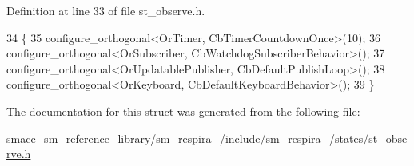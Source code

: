 Definition at line 33 of file st\+\_\+observe.\+h.


\begin{DoxyCode}
34     \{
35         configure\_orthogonal<OrTimer, CbTimerCountdownOnce>(10);
36         configure\_orthogonal<OrSubscriber, CbWatchdogSubscriberBehavior>();
37         configure\_orthogonal<OrUpdatablePublisher, CbDefaultPublishLoop>();
38         configure\_orthogonal<OrKeyboard, CbDefaultKeyboardBehavior>();
39     \}
\end{DoxyCode}


The documentation for this struct was generated from the following file\+:\begin{DoxyCompactItemize}
\item 
smacc\+\_\+sm\+\_\+reference\+\_\+library/sm\+\_\+respira\+\_/include/sm\+\_\+respira\+\_/states/\hyperlink{sm__respira__1_2include_2sm__respira__1_2states_2st__observe_8h}{st\+\_\+observe.\+h}\end{DoxyCompactItemize}
